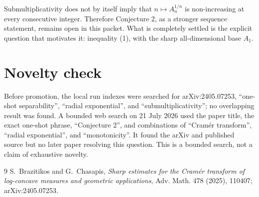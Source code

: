 \documentclass[11pt]{article}
\begin{document}
Submultiplicativity does not by itself imply that
$n\mapsto A_n^{1/n}$ is non-increasing at every consecutive integer.
Therefore Conjecture 2, as a stronger sequence statement, remains open in
this packet.  What is completely settled is the explicit question that
motivates it: inequality (1), with the sharp all-dimensional base $A_1$.

\section{Novelty check}

Before promotion, the local run indexes were searched for arXiv:2405.07253,
``one-shot separability'', ``radial exponential'', and
``submultiplicativity''; no overlapping result was found.  A bounded web
search on 21 July 2026 used the paper title, the exact one-shot phrase,
``Conjecture 2'', and combinations of ``Cram\'er transform'', ``radial
exponential'', and ``monotonicity''.  It found the arXiv and published source
but no later paper resolving this question.  This is a bounded search, not a
claim of exhaustive novelty.

\begin{thebibliography}{9}
S.~Brazitikos and G.~Chasapis,
\emph{Sharp estimates for the Cram\'er transform of log-concave measures and
geometric applications}, Adv. Math. 478 (2025), 110407;
arXiv:2405.07253.
\end{thebibliography}
\end{document}
